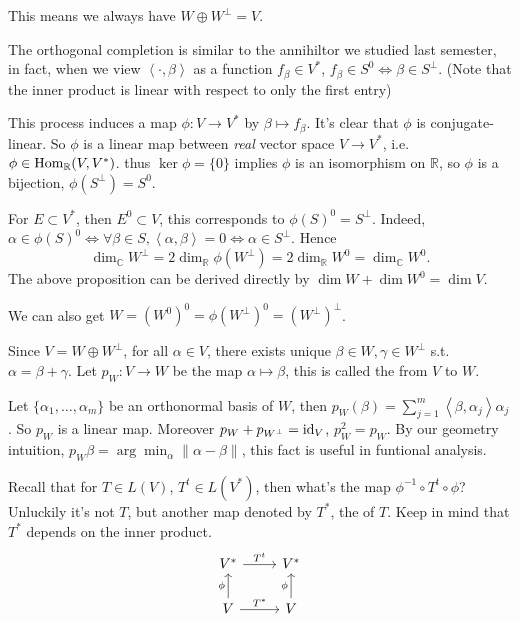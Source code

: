 This means we always have $W\oplus W^\perp = V$.

The orthogonal completion is similar to the annihiltor we studied
last semester, in fact, when we view $\left<\cdot,\beta \right>$ as
a function $f_\beta\in V^*$, $f_\beta \in S^0 \iff \beta\in S^\perp$.
(Note that the inner product is linear with respect to only the first entry)

This process induces a map $\phi: V\to V^*$ by $\beta \mapsto f_\beta$.
It's clear that $\phi$ is conjugate-linear.
So $\phi$ is a linear map between \textit{real} vector space $V\to V^*$,
i.e. $\phi \in \operatorname{Hom}_{\mathbb{R}}(V, V^*)$.
thus $\ker \phi = \{0\}$ implies $\phi$ is an isomorphism on $\mathbb{R}$,
so $\phi$ is a bijection, $\phi(S^\perp) = S^0$.

For $E \subset V^*$, then $E^0 \subset V$, this corresponds
to $\phi(S)^0 = S^\perp$. Indeed, $\alpha\in \phi(S)^0
\iff \forall \beta\in S, \left<\alpha, \beta \right> = 0
\iff \alpha\in S^\perp$.
Hence
\[
	\dim_{\mathbb{C}}W^\perp = 2\dim_{\mathbb{R}}\phi(W^\perp)
	= 2\dim_{\mathbb{R}}W^0 = \dim_{\mathbb{C}} W^0.
\]
The above proposition can be derived directly by $\dim W + \dim W^0 = \dim V$.

We can also get $W=(W^0)^0 = \phi(W^\perp)^0 = (W^\perp)^\perp$.

\begin{definition}
	Since $V = W \oplus W^\perp$, for all  $\alpha\in V$,
	there exists unique $\beta\in W, \gamma\in W^\perp$ s.t. $\alpha = \beta+\gamma$.
	Let $p_W : V\to W$ be the map $\alpha\mapsto \beta$, this
	is called the  from $V$ to $W$.
\end{definition}

Let $\{\alpha_1,\dots,\alpha_m\}$ be an orthonormal basis of $W$,
then $p_W(\beta) = \sum_{j=1}^{m} \left<\beta, \alpha_j \right>\alpha_j$.
So $p_W$ is a linear map. Moreover $p_W + p_{W^\perp} = \operatorname{id}_V$,
$p_W^2 = p_W$. By our geometry intuition,
$p_W\beta = \arg\min_{\alpha} \lVert \alpha - \beta \rVert$,
this fact is useful in funtional analysis.

Recall that for $T\in L(V)$, $T^t \in L(V^*)$, then what's
the map $\phi^{-1}\circ T^t\circ \phi$?
Unluckily it's not $T$, but another map denoted by $T^*$, the 
of $T$. Keep in mind that $T^*$ depends on the inner product.
\begin{equation*}
\begin{tikzcd}
	V^*\rar["T^t"] &V^*\\
	V\uar["\phi"]\rar["T^*"] &V\uar["\phi"]
\end{tikzcd}
\end{equation*}

